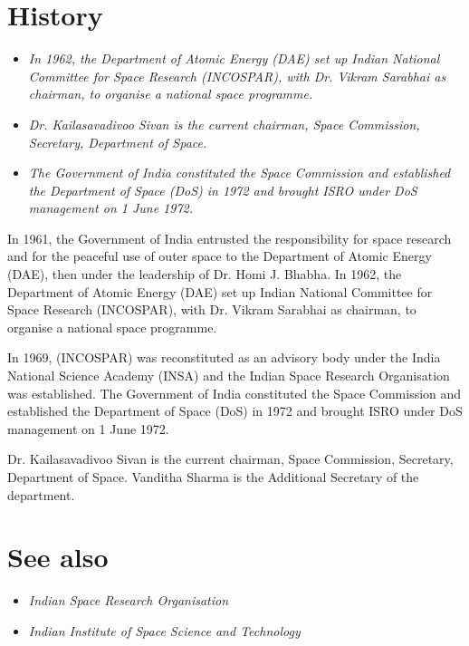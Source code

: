 \section{History}\label{history}

\begin{itemize}
\item
  \emph{In 1962, the Department of Atomic Energy (DAE) set up Indian
  National Committee for Space Research (INCOSPAR), with Dr. Vikram
  Sarabhai as chairman, to organise a national space programme.}
\item
  \emph{Dr. Kailasavadivoo Sivan is the current chairman, Space
  Commission, Secretary, Department of Space.}
\item
  \emph{The Government of India constituted the Space Commission and
  established the Department of Space (DoS) in 1972 and brought ISRO
  under DoS management on 1 June 1972.}
\end{itemize}

In 1961, the Government of India entrusted the responsibility for space
research and for the peaceful use of outer space to the Department of
Atomic Energy (DAE), then under the leadership of Dr. Homi J. Bhabha. In
1962, the Department of Atomic Energy (DAE) set up Indian National
Committee for Space Research (INCOSPAR), with Dr. Vikram Sarabhai as
chairman, to organise a national space programme.

In 1969, (INCOSPAR) was reconstituted as an advisory body under the
India National Science Academy (INSA) and the Indian Space Research
Organisation was established. The Government of India constituted the
Space Commission and established the Department of Space (DoS) in 1972
and brought ISRO under DoS management on 1 June 1972.

Dr. Kailasavadivoo Sivan is the current chairman, Space Commission,
Secretary, Department of Space. Vanditha Sharma is the Additional
Secretary of the department.

\section{See also}\label{see-also}

\begin{itemize}
\item
  \emph{Indian Space Research Organisation}
\item
  \emph{Indian Institute of Space Science and Technology}
\end{itemize}

